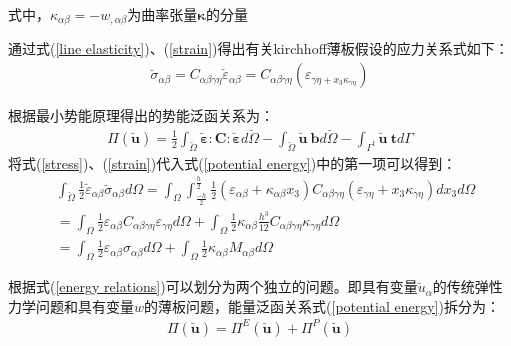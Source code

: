 \documentclass[engineeringmaster]{hquThesis}
\begin{document}
式中，$\kappa_{\alpha\beta}=-w_{,\alpha\beta}$为曲率张量$\pmb{\kappa}$的分量\par
通过式(\ref{line elasticity})、(\ref{strain})得出有关kirchhoff薄板假设的应力关系式如下：
\begin{equation}\label{stress}
\begin{split}
    \breve{\sigma}_{\alpha\beta}=C_{\alpha\beta\gamma\eta}\breve{\varepsilon}_{\alpha\beta}=C_{\alpha\beta\gamma\eta}(\varepsilon_{\gamma\eta+x_3\kappa_{\gamma\eta}})
\end{split}
\end{equation}\par
根据最小势能原理得出的势能泛函关系为：
\begin{equation}\label{potential energy}
\begin{split}
    \Pi(\breve{\pmb{u}})=\frac{1}{2}\int_{\breve{\Omega}}\breve{\pmb{\varepsilon}}\pmb{:}\pmb{C}\pmb{:}\breve{\pmb{\varepsilon}}d\breve{\Omega}-\int_{\breve{\Omega}}\breve{\pmb{u}}~\pmb{b}d\breve{\Omega}-\int_{\Gamma^t}\breve{\pmb{u}}~\pmb{t}d\Gamma
\end{split}
\end{equation}
将式(\ref{stress})、(\ref{strain})代入式(\ref{potential energy})中的第一项可以得到：
\begin{equation}\label{energy relations}
\begin{split}
&\int_{\breve{\Omega}}\frac{1}{2}\breve{\varepsilon}_{\alpha\beta}\breve{\sigma}_{\alpha\beta}d\Omega=\int_{\Omega}\int_{\frac{-h}{2}}^{\frac{h}{2}}\frac{1}{2}(\varepsilon_{\alpha\beta}+\kappa_{\alpha\beta}x_3)C_{\alpha\beta\gamma\eta}(\varepsilon_{\gamma\eta}+x_3\kappa_{\gamma\eta})dx_3d\Omega\\
&=\int_{\Omega}\frac{1}{2}\varepsilon_{\alpha\beta}C_{\alpha\beta\gamma\eta}\varepsilon_{\gamma\eta}d\Omega+\int_{\Omega}\frac{1}{2}\kappa_{\alpha\beta}\frac{h^3}{12}C_{\alpha\beta\gamma\eta}\kappa_{\gamma\eta}d\Omega\\
&=\int_{\Omega}\frac{1}{2}\varepsilon_{\alpha\beta}\sigma_{\alpha\beta}d\Omega+\int_{\Omega}\frac{1}{2}\kappa_{\alpha\beta}M_{\alpha\beta}d\Omega
\end{split}
\end{equation}\par
根据式(\ref{energy relations})可以划分为两个独立的问题。即具有变量$\breve{u}_{\alpha}$的传统弹性力学问题和具有变量$w$的薄板问题，能量泛函关系式(\ref{potential energy})拆分为：
\begin{equation}
\begin{split}
\Pi(\breve{\pmb{u}})=\Pi^E(\breve{\pmb{u}})+\Pi^P(\breve{\pmb{u}})
\end{split}
\end{equation}
\end{document}

